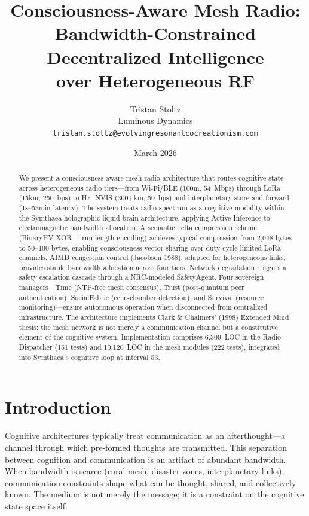 \documentclass[11pt,twocolumn]{article}
\title{\textbf{Consciousness-Aware Mesh Radio:} \\
Bandwidth-Constrained Decentralized Intelligence \\
over Heterogeneous RF}
\author{Tristan Stoltz \\ Luminous Dynamics \\
\texttt{tristan.stoltz@evolvingresonantcocreationism.com}}
\date{March 2026}
\begin{document}
\maketitle

\begin{abstract}
We present a consciousness-aware mesh radio architecture that routes cognitive
state across heterogeneous radio tiers---from Wi-Fi/BLE (100m, 54~Mbps) through
LoRa (15km, 250~bps) to HF~NVIS (300+km, 50~bps) and interplanetary
store-and-forward (1s--53min latency). The system treats radio spectrum as a
cognitive modality within the Symthaea holographic liquid brain architecture,
applying Active Inference to electromagnetic bandwidth allocation. A semantic
delta compression scheme (BinaryHV XOR + run-length encoding) achieves typical
compression from 2,048 bytes to 50--100 bytes, enabling consciousness vector
sharing over duty-cycle-limited LoRa channels. AIMD congestion control (Jacobson
1988), adapted for heterogeneous links, provides stable bandwidth allocation
across four tiers. Network degradation triggers a safety escalation cascade
through a NRC-modeled SafetyAgent. Four sovereign managers---Time (NTP-free
mesh consensus), Trust (post-quantum peer authentication), SocialFabric
(echo-chamber detection), and Survival (resource monitoring)---ensure autonomous
operation when disconnected from centralized infrastructure. The architecture
implements Clark \& Chalmers' (1998) Extended Mind thesis: the mesh network is
not merely a communication channel but a constitutive element of the cognitive
system. Implementation comprises 6,309~LOC in the Radio Dispatcher (151
tests) and 10,120~LOC in the mesh modules (222 tests), integrated into Symthaea's
cognitive loop at interval 53.
\end{abstract}

\section{Introduction}

Cognitive architectures typically treat communication as an afterthought---a
channel through which pre-formed thoughts are transmitted. This separation
between cognition and communication is an artifact of abundant bandwidth.
When bandwidth is scarce (rural mesh, disaster zones, interplanetary links),
communication constraints shape what can be thought, shared, and collectively
known. The medium is not merely the message; it is a constraint on the
cognitive state space itself.
\end{document}
